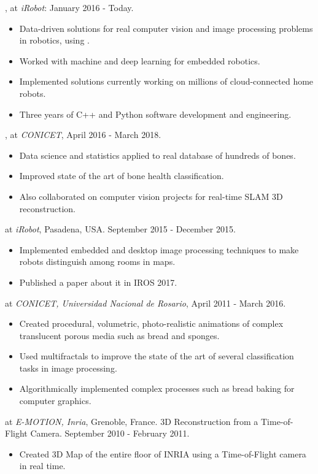 \documentclass[a4paper,10pt]{article}
\begin{document}
, at {\em iRobot}: January 2016 - Today.
\begin{itemize}
\item Data-driven solutions for real computer vision and image processing problems in robotics, using .
\item Worked with machine and deep learning for embedded robotics.
\item Implemented solutions currently working on millions of cloud-connected home robots.
\item Three years of C++ and Python software development and engineering.
\end{itemize}

, at {\em CONICET}, April 2016 - March 2018.
\begin{itemize}
\item Data science and statistics applied to real database of hundreds of bones.
\item Improved state of the art of bone health classification.
\item Also collaborated on computer vision projects for real-time SLAM 3D reconstruction.
\end{itemize}

 at {\em iRobot}, Pasadena, USA. September 2015 - December 2015.
\begin{itemize}
\item Implemented embedded and desktop image processing techniques to make robots distinguish among rooms in maps.
\item Published a paper about it in IROS 2017.
\end{itemize}

 at {\em CONICET, Universidad Nacional de Rosario}, April 2011 - March 2016.
\begin{itemize}
\item Created procedural, volumetric, photo-realistic animations of complex translucent porous media such as bread and sponges.
\item Used multifractals to improve the state of the art of several classification tasks in image processing.
\item Algorithmically implemented complex processes such as bread baking for computer graphics.
\end{itemize}

 at {\em E-MOTION, Inria}, Grenoble, France. 3D Reconstruction from a Time-of-Flight Camera. September 2010 - February 2011.
\begin{itemize}
\item Created 3D Map of the entire floor of INRIA using a Time-of-Flight camera in real time.
\end{itemize}
\end{document}
